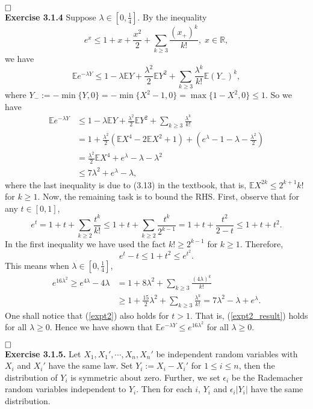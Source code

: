 \documentclass[12pt]{extarticle}
\begin{document}
$\hspace{\fill}\square$\\
\textbf{Exercise 3.1.4}
Suppose $\lambda\in[0,\frac{1}{4}]$.
By the inequality
\[
e^x\leq 1+x+\frac{x^2}{2}+\sum_{k\geq 3}\frac{(x_+)^k}{k!},\;x\in\mathbb{R},
\]
we have
\[
\mathbb{E}e^{-\lambda Y}\leq 1-\lambda\mathbb{E}Y+\frac{\lambda^2}{2}\mathbb{E}Y^2+\sum_{k\geq 3}\frac{\lambda^k}{k!}\mathbb{E}(Y_-)^k,
\]
where $Y_-:=-\min\{Y,0\}
=-\min\{X^2-1,0\}
=\max\{1-X^2,0\}\leq 1$.
So we have
\[
\begin{aligned}
\mathbb{E}e^{-\lambda Y}
&\leq
1-\lambda\mathbb{E}Y+\frac{\lambda^2}{2}\mathbb{E}Y^2+\sum_{k\geq 3}\frac{\lambda^k}{k!}
\\&
=
1+\frac{\lambda^2}{2}(\mathbb{E}X^4-2\mathbb{E}X^2+1)
+\left(e^\lambda-1-\lambda-\frac{\lambda^2}{2}\right)
\\&
=\frac{\lambda^2}{2}\mathbb{E}X^4+e^\lambda-\lambda-\lambda^2
\\&
\leq
7\lambda^2+e^\lambda-\lambda,
\end{aligned}
\]
where the last inequality is due to (3.13) in the textbook, that is,
$\mathbb{E}X^{2k}\leq 2^{k+1}k!$ for $k\geq 1$.
Now, the remaining task is to bound the RHS.
First, observe that for any $t\in[0,1]$,
\[
e^t=1+t+\sum_{k\geq 2}\frac{t^k}{k!}
\leq
1+t+\sum_{k\geq 2}\frac{t^k}{2^{k-1}}
=
1+t+\frac{t^2}{2-t}\leq 1+t+t^2.
\]
In the first inequality we have used the fact $k!\geq 2^{k-1}$ for $k\geq 1$. Therefore,
\begin{equation}
e^t-t\leq 1+t^2\leq e^{t^2}.
\label{expt2}
\end{equation}
This means when $\lambda\in[0,\frac{1}{4}]$,
\begin{equation}
\begin{aligned}
e^{16\lambda^2}\geq e^{4\lambda}-4\lambda
&=
1+8\lambda^2+\sum_{k\geq 3}\frac{(4\lambda)^k}{k!}
\\&\geq
1+\frac{15}{2}\lambda^2+\sum_{k\geq 3}\frac{\lambda^k}{k!}
=
7\lambda^2-\lambda+e^{\lambda}.
\end{aligned}
\label{expt2_result}
\end{equation}
One shall notice that (\ref{expt2}) also holds for $t>1$. That is, (\ref{expt2_result}) holds for all $\lambda\geq 0$.
Hence we have shown that $\mathbb{E}e^{-\lambda Y}\leq e^{16\lambda^2}$ for all $\lambda\geq 0$.

$\hspace{\fill}\square$\\
\textbf{Exercise 3.1.5.} Let $X_1,X_1',\cdots,X_n,X_n'$ be independent random variables  with $X_i$ and $X_i'$ have the same law.
Set $Y_i:=X_i-X_i'$ for $1\leq i\leq n$, then the distribution of $Y_i$ is symmetric about zero.
Further, we set $\epsilon_i$ be the Rademacher random variables independent to $Y_i$.
Then for each $i$, $Y_i$ and $\epsilon_i|Y_i|$ have the same distribution.
\end{document}
